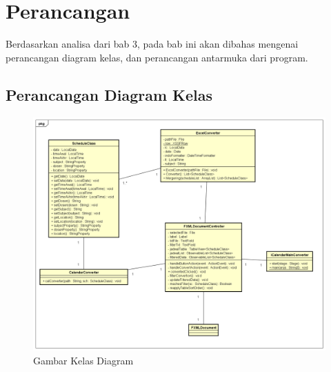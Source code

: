 \chapter{Perancangan}
\label{chap:design}

Berdasarkan analisa dari bab 3, pada bab ini akan dibahas mengenai perancangan diagram kelas, dan perancangan antarmuka dari
program.

\section{Perancangan Diagram Kelas}
\begin{figure}[H]
	\centering
	\includegraphics[scale=0.4]{Gambar/kelas-diagram}
	\caption{Gambar Kelas Diagram}
	\label{fig:pemodelan-kelas}
\end{figure}